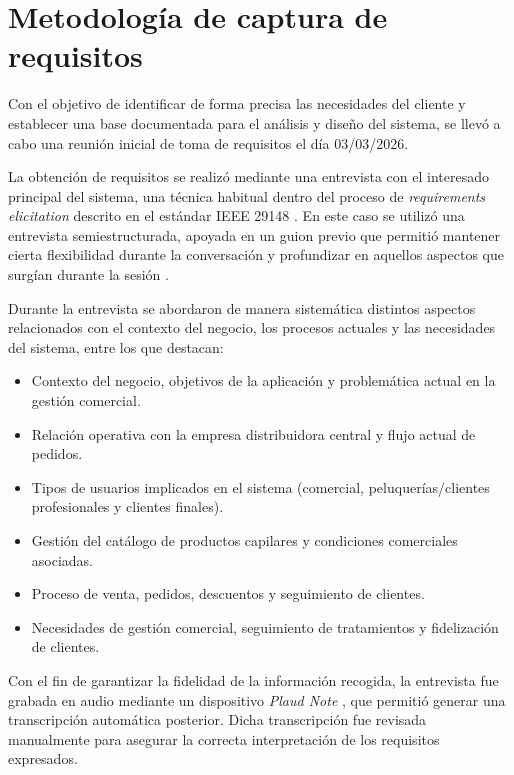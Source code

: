 \section{Metodología de captura de requisitos}
\label{sec:RequirementsCaptureMethodology}

Con el objetivo de identificar de forma precisa las necesidades del cliente y establecer una base documentada para el análisis y diseño del sistema, se llevó a cabo una reunión inicial de toma de requisitos el día 03/03/2026.

La obtención de requisitos se realizó mediante una entrevista con el interesado principal del sistema, una técnica habitual dentro del proceso de \textit{requirements elicitation} descrito en el estándar IEEE 29148 \citep{ieee29148}. En este caso se utilizó una entrevista semiestructurada, apoyada en un guion previo que permitió mantener cierta flexibilidad durante la conversación y profundizar en aquellos aspectos que surgían durante la sesión \citep[pp.~104--106]{sommerville}.

Durante la entrevista se abordaron de manera sistemática distintos aspectos relacionados con el contexto del negocio, los procesos actuales y las necesidades del sistema, entre los que destacan:

\begin{itemize}
    \item Contexto del negocio, objetivos de la aplicación y problemática actual en la gestión comercial.
    \item Relación operativa con la empresa distribuidora central y flujo actual de pedidos.
    \item Tipos de usuarios implicados en el sistema (comercial, peluquerías/clientes profesionales y clientes finales).
    \item Gestión del catálogo de productos capilares y condiciones comerciales asociadas.
    \item Proceso de venta, pedidos, descuentos y seguimiento de clientes.
    \item Necesidades de gestión comercial, seguimiento de tratamientos y fidelización de clientes.
\end{itemize}

Con el fin de garantizar la fidelidad de la información recogida, la entrevista fue grabada en audio mediante un dispositivo \textit{Plaud Note} \citep{plaudnote}, que permitió generar una transcripción automática posterior. Dicha transcripción fue revisada manualmente para asegurar la correcta interpretación de los requisitos expresados.


